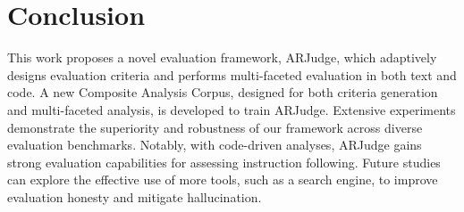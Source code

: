 \section{Conclusion}

This work proposes a novel evaluation framework, ARJudge, which adaptively designs evaluation criteria and performs multi-faceted evaluation in both text and code. A new Composite Analysis Corpus, designed for both criteria generation and multi-faceted analysis, is developed to train ARJudge. Extensive experiments demonstrate the superiority and robustness of our framework across diverse evaluation benchmarks. Notably, with code-driven analyses, ARJudge gains strong evaluation capabilities for assessing instruction following. Future studies can explore the effective use of more tools, such as a search engine, to improve evaluation honesty and mitigate hallucination.
